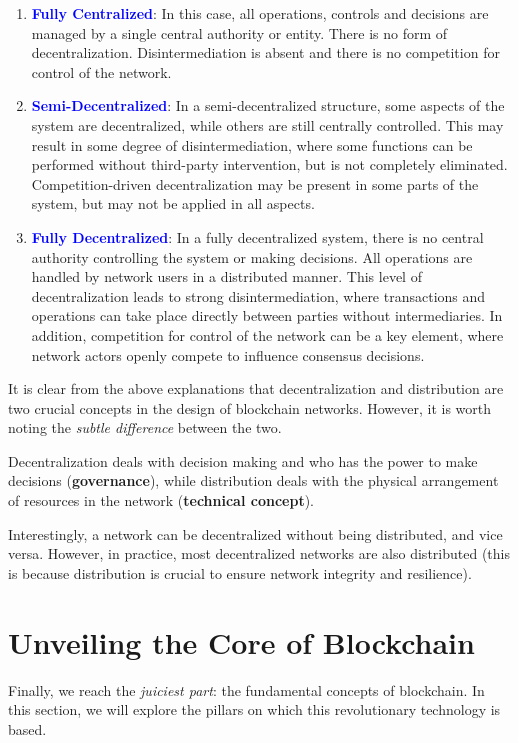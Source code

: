 \begin{enumerate}
\item \textbf{\textcolor{Blue}{Fully Centralized}}: In this case, all operations, controls and decisions are managed by a single central authority or entity. There is no form of decentralization. Disintermediation is absent and there is no competition for control of the network.

\item \textbf{\textcolor{Blue}{Semi-Decentralized}}: In a semi-decentralized structure, some aspects of the system are decentralized, while others are still centrally controlled. This may result in some degree of disintermediation, where some functions can be performed without third-party intervention, but is not completely eliminated. Competition-driven decentralization may be present in some parts of the system, but may not be applied in all aspects.

\item \textbf{\textcolor{Blue}{Fully Decentralized}}: In a fully decentralized system, there is no central authority controlling the system or making decisions. All operations are handled by network users in a distributed manner. This level of decentralization leads to strong disintermediation, where transactions and operations can take place directly between parties without intermediaries. In addition, competition for control of the network can be a key element, where network actors openly compete to influence consensus decisions.
\end{enumerate}

It is clear from the above explanations that decentralization and distribution are two crucial concepts in the design of blockchain networks. However, it is worth noting the \textit{subtle difference} between the two.

Decentralization deals with decision making and who has the power to make decisions (\textbf{governance}), while distribution deals with the physical arrangement of resources in the network (\textbf{technical concept}).

Interestingly, a network can be decentralized without being distributed, and vice versa. However, in practice, most decentralized networks are also distributed (this is because distribution is crucial to ensure network integrity and resilience).

\section{Unveiling the Core of Blockchain}
Finally, we reach the \textit{juiciest part}: the fundamental concepts of blockchain. In this section, we will explore the pillars on which this revolutionary technology is based.

